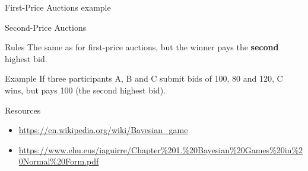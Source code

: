 \documentclass[11pt]{beamer}
\begin{document}
\begin{frame}{First-Price Auctions example}


\end{frame}


\begin{frame}{Second-Price Auctions}
    \begin{block}{Rules}
        The same as for first-price auctions, but the winner pays the \textbf{second} highest bid.
    \end{block}

    \begin{block}{Example}
        If three participants A, B and C submit bids of 100, 80 and 120, C wins, but pays 100 (the second highest bid).
    \end{block}
\end{frame}


\begin{frame}{Resources}
    \begin{itemize}
        \item \url{https://en.wikipedia.org/wiki/Bayesian_game}
        \item \url{https://www.ehu.eus/iaguirre/Chapter\%201.\%20Bayesian\%20Games\%20in\%20Normal\%20Form.pdf}
    \end{itemize}
\end{frame}
\end{document}
